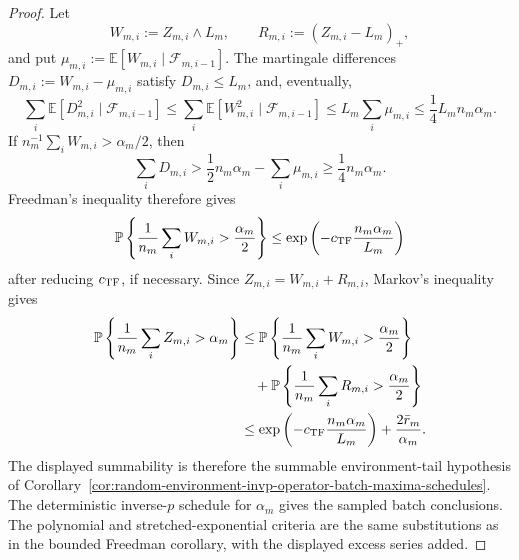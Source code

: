 \documentclass[11pt]{amsart}
\numberwithin{equation}{section}
\theoremstyle{definition}
\theoremstyle{remark}
\newcommand{\Prob}{\mathbb P}
\newcommand{\Exp}{\mathbb E}
\begin{document}
\begin{proof}
Let
\[
  W_{m,i}:=Z_{m,i}\wedge L_m,\qquad
  R_{m,i}:=(Z_{m,i}-L_m)_+,
\]
and put \(\mu_{m,i}:=\Exp[W_{m,i}\mid\mathcal F_{m,i-1}]\).  The martingale
differences \(D_{m,i}:=W_{m,i}-\mu_{m,i}\) satisfy \(D_{m,i}\le L_m\), and,
eventually,
\[
  \sum_i\Exp[D_{m,i}^2\mid\mathcal F_{m,i-1}]
  \le \sum_i\Exp[W_{m,i}^2\mid\mathcal F_{m,i-1}]
  \le L_m\sum_i\mu_{m,i}
  \le \frac14 L_m n_m\alpha_m .
\]
If \(n_m^{-1}\sum_i W_{m,i}>\alpha_m/2\), then
\[
  \sum_iD_{m,i}
  >
  \frac12 n_m\alpha_m-\sum_i\mu_{m,i}
  \ge \frac14 n_m\alpha_m .
\]
Freedman's inequality therefore gives
\[
  \Prob\left\{\frac1{n_m}\sum_i W_{m,i}>\frac{\alpha_m}{2}\right\}
  \le
  \exp\left(-c_{\rm TF}\frac{n_m\alpha_m}{L_m}\right)
\]
after reducing \(c_{\rm TF}\), if necessary.  Since \(Z_{m,i}=W_{m,i}+R_{m,i}\),
Markov's inequality gives
\[
\begin{aligned}
  \Prob\left\{\frac1{n_m}\sum_i Z_{m,i}>\alpha_m\right\}
  &\le
  \Prob\left\{\frac1{n_m}\sum_i W_{m,i}>\frac{\alpha_m}{2}\right\}  \\
  &\quad+
  \Prob\left\{\frac1{n_m}\sum_i R_{m,i}>\frac{\alpha_m}{2}\right\}  \\
  &\le
  \exp\left(-c_{\rm TF}\frac{n_m\alpha_m}{L_m}\right)
  +\frac{2\bar r_m}{\alpha_m}.
\end{aligned}
\]
The displayed summability is therefore the summable environment-tail hypothesis
of Corollary~\ref{cor:random-environment-invp-operator-batch-maxima-schedules}.
The deterministic inverse-\(p\) schedule for \(\alpha_m\) gives the sampled
batch conclusions.  The polynomial and stretched-exponential criteria are the
same substitutions as in the bounded Freedman corollary, with the displayed
excess series added.
\end{proof}
\end{document}
